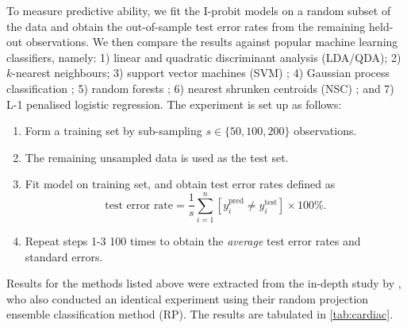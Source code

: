 \documentclass[a4paper,showframe,11pt]{report}\usepackage[]{graphicx}\usepackage[]{color}
\begin{document}
To measure predictive ability, we fit the I-probit models on a random subset of the data and obtain the out-of-sample test error rates from the remaining held-out observations.
We then compare the results against popular machine learning classifiers, namely: 1) linear and quadratic discriminant analysis (LDA/QDA); 2) $k$-nearest neighbours; 3) support vector machines (SVM) \citep{steinwart2008support}; 4) Gaussian process classification \citep{rasmussen2006gaussian}; 5) random forests \citep{breiman2001random}; 6) nearest shrunken centroids (NSC) \citep{tibshirani2002diagnosis}; and 7) L-1 penalised logistic regression.
The experiment is set up as follows:
\begin{enumerate}
  \item Form a training set by sub-sampling $s \in \{50, 100, 200\}$ observations.
  \item The remaining unsampled data is used as the test set.
  \item Fit model on training set, and obtain test error rates defined as
  \[
    \text{test error rate} = \frac{1}{s} \sum_{i=1}^n [y^{\text{pred}}_i \neq y^{\text{test}}_i] \times 100 \%.
  \]
  \item Repeat steps 1-3 100 times to obtain the \emph{average} test error rates and standard errors.
\end{enumerate}
Results for the methods listed above were extracted from the in-depth study by \citet{cannings2017random}, who also conducted an identical experiment using their random projection ensemble classification method (RP).
The results are tabulated in \cref{tab:cardiac}.
\end{document}
